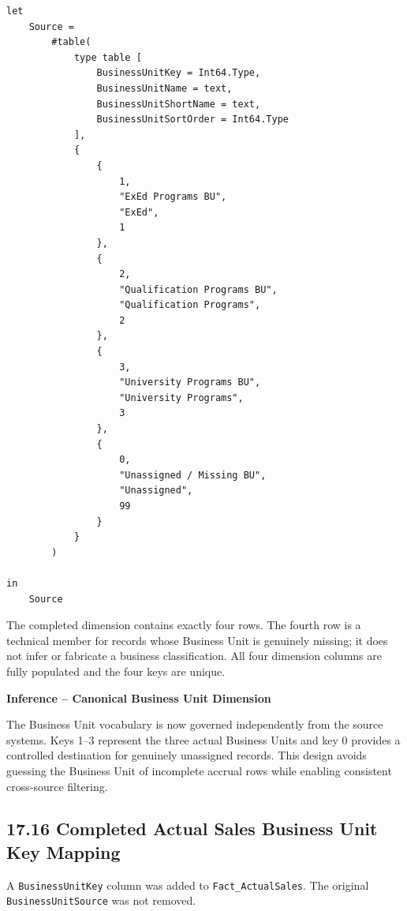 \documentclass[11pt,a4paper]{article}
\begin{document}
\begin{lstlisting}[style=powerquery]
let
    Source =
        #table(
            type table [
                BusinessUnitKey = Int64.Type,
                BusinessUnitName = text,
                BusinessUnitShortName = text,
                BusinessUnitSortOrder = Int64.Type
            ],
            {
                {
                    1,
                    "ExEd Programs BU",
                    "ExEd",
                    1
                },
                {
                    2,
                    "Qualification Programs BU",
                    "Qualification Programs",
                    2
                },
                {
                    3,
                    "University Programs BU",
                    "University Programs",
                    3
                },
                {
                    0,
                    "Unassigned / Missing BU",
                    "Unassigned",
                    99
                }
            }
        )

in
    Source
\end{lstlisting}

The completed dimension contains exactly four rows. The fourth row is a technical
member for records whose Business Unit is genuinely missing; it does not infer
or fabricate a business classification. All four dimension columns are fully
populated and the four keys are unique.

\begin{inferencebox}

\textbf{Inference -- Canonical Business Unit Dimension}

The Business Unit vocabulary is now governed independently from the source
systems. Keys 1--3 represent the three actual Business Units and key 0 provides
a controlled destination for genuinely unassigned records. This design avoids
guessing the Business Unit of incomplete accrual rows while enabling consistent
cross-source filtering.

\end{inferencebox}

\subsection{17.16 Completed Actual Sales Business Unit Key Mapping}

A \texttt{BusinessUnitKey} column was added to
\texttt{Fact\_ActualSales}. The original \texttt{BusinessUnitSource} was not
removed.
\end{document}
